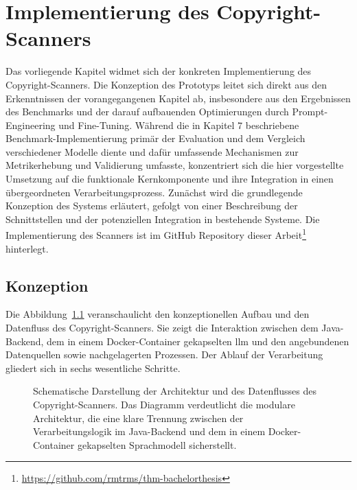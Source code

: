 \chapter{Implementierung des Copyright-Scanners}\label{ch:copyright-scanner}

Das vorliegende Kapitel widmet sich der konkreten Implementierung des Copyright-Scanners.
Die Konzeption des Prototyps leitet sich direkt aus den Erkenntnissen der vorangegangenen Kapitel ab, insbesondere aus den Ergebnissen des Benchmarks und der darauf aufbauenden Optimierungen durch Prompt-Engineering und Fine-Tuning.
Während die in Kapitel 7 beschriebene Benchmark-Implementierung primär der Evaluation und dem Vergleich verschiedener Modelle diente und dafür umfassende Mechanismen zur Metrikerhebung und Validierung umfasste, konzentriert sich die hier vorgestellte Umsetzung auf die funktionale Kernkomponente und ihre Integration in einen übergeordneten Verarbeitungsprozess.
Zunächst wird die grundlegende Konzeption des Systems erläutert, gefolgt von einer Beschreibung der Schnittstellen und der potenziellen Integration in bestehende Systeme.
Die Implementierung des Scanners ist im GitHub Repository dieser Arbeit\footnote{\url{https://github.com/rmtrms/thm-bachelorthesis}} hinterlegt.


\section{Konzeption}

Die Abbildung~\ref{fig:copyright-scanner} veranschaulicht den konzeptionellen Aufbau und den Datenfluss des Copyright-Scanners.
Sie zeigt die Interaktion zwischen dem Java-Backend, dem in einem Docker-Container gekapselten \gls{llm} und den angebundenen Datenquellen sowie nachgelagerten Prozessen.
Der Ablauf der Verarbeitung gliedert sich in sechs wesentliche Schritte.

\begin{figure}[ht]
    \centering
    \caption{Schematische Darstellung der Architektur und des Datenflusses des Copyright-Scanners. Das Diagramm verdeutlicht die modulare Architektur, die eine klare Trennung zwischen der Verarbeitungslogik im Java-Backend und dem in einem Docker-Container gekapselten Sprachmodell sicherstellt.}
    \label{fig:copyright-scanner}
\end{figure}

